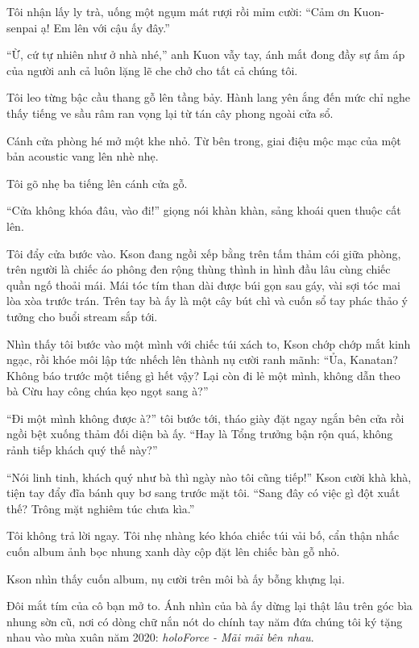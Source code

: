 \documentclass[../main.tex]{subfiles}
\begin{document}
Tôi nhận lấy ly trà, uống một ngụm mát rượi rồi mỉm cười: ``Cảm ơn Kuon-senpai ạ! Em lên với cậu ấy đây.''

``Ừ, cứ tự nhiên như ở nhà nhé,'' anh Kuon vẫy tay, ánh mắt đong đầy sự ấm áp của người anh cả luôn lặng lẽ che chở cho tất cả chúng tôi.

\ct

Tôi leo từng bậc cầu thang gỗ lên tầng bảy. Hành lang yên ắng đến mức chỉ nghe thấy tiếng ve sầu râm ran vọng lại từ tán cây phong ngoài cửa sổ.

Cánh cửa phòng hé mở một khe nhỏ. Từ bên trong, giai điệu mộc mạc của một bản acoustic vang lên nhè nhẹ.

Tôi gõ nhẹ ba tiếng lên cánh cửa gỗ.

``Cửa không khóa đâu, vào đi!'' giọng nói khàn khàn, sảng khoái quen thuộc cất lên.

Tôi đẩy cửa bước vào. Kson đang ngồi xếp bằng trên tấm thảm cói giữa phòng, trên người là chiếc áo phông đen rộng thùng thình in hình đầu lâu cùng chiếc quần ngố thoải mái. Mái tóc tím than dài được búi gọn sau gáy, vài sợi tóc mai lòa xòa trước trán. Trên tay bà ấy là một cây bút chì và cuốn sổ tay phác thảo ý tưởng cho buổi stream sắp tới.

Nhìn thấy tôi bước vào một mình với chiếc túi xách to, Kson chớp chớp mắt kinh ngạc, rồi khóe môi lập tức nhếch lên thành nụ cười ranh mãnh: ``Ủa, Kanatan? Không báo trước một tiếng gì hết vậy? Lại còn đi lẻ một mình, không dẫn theo bà Cừu hay công chúa kẹo ngọt sang à?''

``Đi một mình không được à?'' tôi bước tới, tháo giày đặt ngay ngắn bên cửa rồi ngồi bệt xuống thảm đối diện bà ấy. ``Hay là Tổng trưởng bận rộn quá, không rảnh tiếp khách quý thế này?''

``Nói linh tinh, khách quý như bà thì ngày nào tôi cũng tiếp!'' Kson cười khà khà, tiện tay đẩy đĩa bánh quy bơ sang trước mặt tôi. ``Sang đây có việc gì đột xuất thế? Trông mặt nghiêm túc chưa kìa.''

Tôi không trả lời ngay. Tôi nhẹ nhàng kéo khóa chiếc túi vải bố, cẩn thận nhấc cuốn album ảnh bọc nhung xanh dày cộp đặt lên chiếc bàn gỗ nhỏ.

Kson nhìn thấy cuốn album, nụ cười trên môi bà ấy bỗng khựng lại.

Đôi mắt tím của cô bạn mở to. Ánh nhìn của bà ấy dừng lại thật lâu trên góc bìa nhung sờn cũ, nơi có dòng chữ nắn nót do chính tay năm đứa chúng tôi ký tặng nhau vào mùa xuân năm 2020: \textit{holoForce - Mãi mãi bên nhau}.
\end{document}
